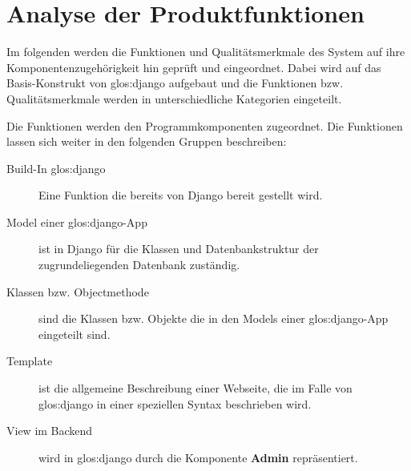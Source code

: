 \chapter{Analyse der Produktfunktionen}

%
%
Im folgenden werden die Funktionen und Qualitätsmerkmale des System auf ihre
Komponentenzugehörigkeit hin geprüft und eingeordnet. Dabei wird auf das
Basis-Konstrukt von \gls{glos:django} aufgebaut und die Funktionen bzw. Qualitätsmerkmale
werden in unterschiedliche Kategorien eingeteilt.

Die Funktionen werden den Programmkomponenten zugeordnet. Die Funktionen lassen
sich weiter in den folgenden Gruppen beschreiben:
\begin{description}
	\item[Build-In \gls{glos:django}] Eine Funktion die bereits von Django bereit gestellt
	  wird.
	\item[Model einer \gls{glos:django}-App] ist in Django für die Klassen und
	  Datenbankstruktur der zugrundeliegenden Datenbank zuständig.
	\item[Klassen bzw. Objectmethode] sind die Klassen bzw. Objekte die in den
	  Models einer \gls{glos:django}-App eingeteilt sind.
	\item[Template] ist die allgemeine Beschreibung einer Webseite, die im Falle
	  von \gls{glos:django} in einer speziellen Syntax beschrieben wird.
	\item[View im Backend] wird in \gls{glos:django} durch die Komponente \textbf{Admin}
	  repräsentiert.
\end{description}

